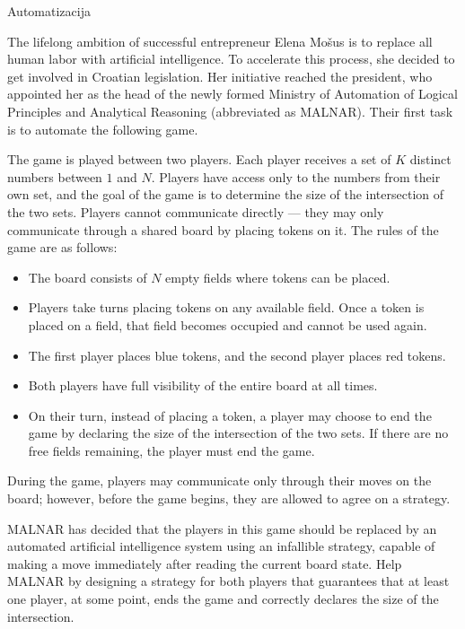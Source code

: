 \begin{statement}[
  problempoints=100,
  timelimit=6 seconds,
  memorylimit=512 MiB,
]{Automatizacija}

The lifelong ambition of successful entrepreneur Elena Mošus is to replace all human labor 
with artificial intelligence.  
To accelerate this process, she decided to get involved in Croatian legislation.  
Her initiative reached the president, who appointed her as the head of the newly formed 
Ministry of Automation of Logical Principles and Analytical Reasoning 
(abbreviated as MALNAR).  
Their first task is to automate the following game.

The game is played between two players.  
Each player receives a set of $K$ distinct numbers between $1$ and $N$.  
Players have access only to the numbers from their own set, and the goal of the game 
is to determine the size of the intersection of the two sets.  
Players cannot communicate directly — they may only communicate through a shared board 
by placing tokens on it.  
The rules of the game are as follows:
\begin{itemize}[noitemsep,topsep=0pt,parsep=0pt,partopsep=0pt]
  \item 
  The board consists of $N$ empty fields where tokens can be placed. 

  \item 
  Players take turns placing tokens on any available field.  
  Once a token is placed on a field, that field becomes occupied and cannot be used again. 

  \item 
  The first player places blue tokens, and the second player places red tokens.

  \item 
  Both players have full visibility of the entire board at all times.

  \item 
  On their turn, instead of placing a token, a player may choose to end the game 
  by declaring the size of the intersection of the two sets.  
  If there are no free fields remaining, the player must end the game.
\end{itemize}
During the game, players may communicate only through their moves on the board; however, 
before the game begins, they are allowed to agree on a strategy.

MALNAR has decided that the players in this game should be replaced 
by an automated artificial intelligence system using an infallible strategy, capable of 
making a move immediately after reading the current board state.  
Help MALNAR by designing a strategy for both players 
that guarantees that at least one player, at some point, ends the game and correctly 
declares the size of the intersection.


\end{statement}
